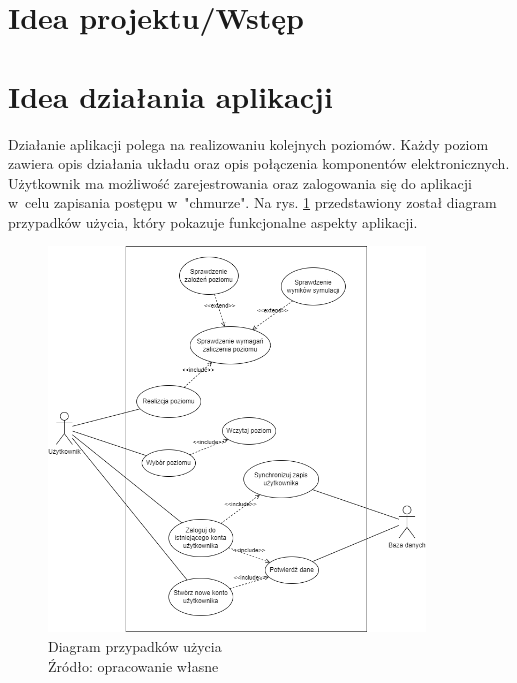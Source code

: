 \documentclass[12pt,a4paper]{article} %
\begin{document}


\section{Idea projektu/Wstęp}


\section{Idea działania aplikacji}

\aka Działanie aplikacji polega na realizowaniu kolejnych poziomów. Każdy poziom zawiera opis działania układu oraz opis połączenia  komponentów elektronicznych. Użytkownik ma możliwość zarejestrowania oraz zalogowania się do aplikacji w~celu zapisania postępu  w~"chmurze".
Na rys. \ref{rys:diagram-przypadków-użycia}  przedstawiony został diagram przypadków użycia, który pokazuje funkcjonalne aspekty aplikacji.  

\begin{figure}[h]
	\centering
	\includegraphics[width=10cm]{images/use_case_diagram.png}
	\caption{Diagram przypadków użycia \\ Źródło: opracowanie własne}
	\label{rys:diagram-przypadków-użycia} %
\end{figure}
  
\end{document}
